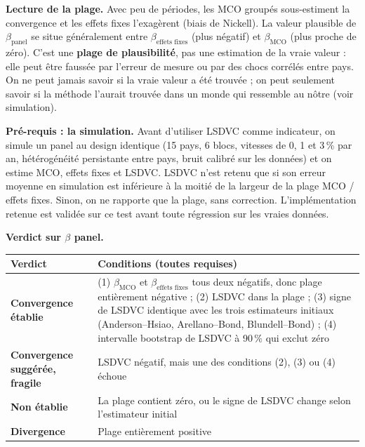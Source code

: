 \documentclass[14pt,a4paper]{article}
\newcommand{\bet}{\texorpdfstring{$\beta$}{beta}}
\begin{document}
	\textbf{Lecture de la plage.} Avec peu de périodes, les MCO groupés sous-estiment la convergence et les effets fixes l'exagèrent (biais de Nickell). La valeur plausible de $\beta_{\text{panel}}$ se situe généralement entre $\beta_{\text{effets fixes}}$ (plus négatif) et $\beta_{\text{MCO}}$ (plus proche de zéro). C'est une \textbf{plage de plausibilité}, pas une estimation de la vraie valeur : elle peut être faussée par l'erreur de mesure ou par des chocs corrélés entre pays. On ne peut jamais savoir si la vraie valeur a été trouvée ; on peut seulement savoir si la méthode l'aurait trouvée dans un monde qui ressemble au nôtre (voir simulation).
	
	\textbf{Pré-requis : la simulation.} Avant d'utiliser LSDVC comme indicateur, on simule un panel au design identique (15 pays, 6 blocs, vitesses de 0, 1 et 3\,\% par an, hétérogénéité persistante entre pays, bruit calibré sur les données) et on estime MCO, effets fixes et LSDVC. LSDVC n'est retenu que si son erreur moyenne en simulation est inférieure à la moitié de la largeur de la plage MCO / effets fixes. Sinon, on ne rapporte que la plage, sans correction. L'implémentation retenue est validée sur ce test avant toute régression sur les vraies données.
	
	\textbf{Verdict sur \bet{} panel.}
	
	\begin{center}
		\small
		\begin{tabularx}{\textwidth}{@{}>{\raggedright\arraybackslash}p{3.6cm}X@{}}
			\toprule
			\textbf{Verdict} & \textbf{Conditions (toutes requises)} \\
			\midrule
			\textbf{Convergence établie} & (1) $\beta_{\text{MCO}}$ et $\beta_{\text{effets fixes}}$ tous deux négatifs, donc plage entièrement négative ; (2) LSDVC dans la plage ; (3) signe de LSDVC identique avec les trois estimateurs initiaux (Anderson--Hsiao, Arellano--Bond, Blundell--Bond) ; (4) intervalle bootstrap de LSDVC à 90\,\% qui exclut zéro \\
			\addlinespace
			\textbf{Convergence suggérée, fragile} & LSDVC négatif, mais une des conditions (2), (3) ou (4) échoue \\
			\addlinespace
			\textbf{Non établie} & La plage contient zéro, ou le signe de LSDVC change selon l'estimateur initial \\
			\addlinespace
			\textbf{Divergence} & Plage entièrement positive \\
			\bottomrule
		\end{tabularx}
	\end{center}
	
\end{document}
